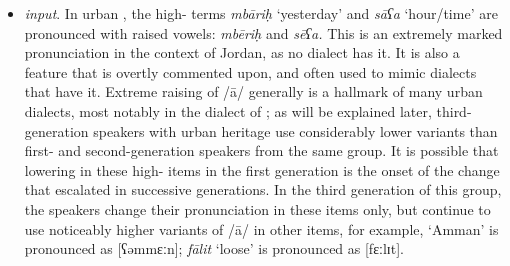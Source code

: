\documentclass[output=paper]{langsci/langscibook}
\begin{document}
\begin{itemize}
\item[] \textit{ input}. In urban , the high- terms \textit{mbāriḥ} `yesterday’ and \textit{sāʕa} ‘hour/time’ are pronounced with raised vowels: \textit{mbēriḥ} and \textit{sēʕa.} This is an extremely marked pronunciation in the context of Jordan, as no  dialect has it. It is also a feature that is overtly commented upon, and often used to mimic dialects that have it. Extreme raising of /ā/ generally is a hallmark of many urban  dialects, most notably in the dialect of ; as will be explained later, third-generation speakers with urban  heritage use considerably lower variants than first- and second-generation speakers from the same group. It is possible that lowering in these high- items in the first generation is the onset of the change that escalated in successive generations. In the third generation of this group, the speakers change their pronunciation in these items only, but continue to use noticeably higher variants of /ā/ in other items, for example, ‘Amman’ is pronounced as [ʕəmmɛːn]; \textit{fālit} ‘loose’ is pronounced as [fɛːlɪt].
\end{itemize}
\end{document}
